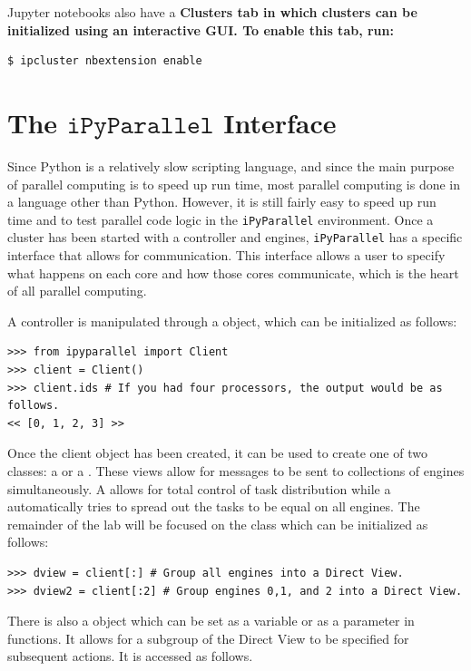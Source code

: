 \begin{info}
Jupyter notebooks also have a \bf{Clusters} tab in which clusters can be initialized using an interactive GUI.
To enable this tab, run:
\begin{lstlisting}[style=ShellInput]
$ ipcluster nbextension enable
\end{lstlisting}
\end{info}


\section*{The $\texttt{iPyParallel}$ Interface}
Since Python is a relatively slow scripting language, and since the main purpose of parallel computing is to speed up run time, most parallel computing is done in a language other than Python.
However, it is still fairly easy to speed up run time and to test parallel code logic in the \texttt{iPyParallel} environment.
Once a cluster has been started with a controller and engines, \texttt{iPyParallel} has a specific interface that allows for communication. 
This interface allows a user to specify what happens on each core and how those cores communicate, which is the heart of all parallel computing.

A controller is manipulated through a  object, which can be initialized as follows:

\begin{lstlisting}
>>> from ipyparallel import Client
>>> client = Client()
>>> client.ids # If you had four processors, the output would be as follows.
<< [0, 1, 2, 3] >>
\end{lstlisting}

Once the client object has been created, it can be used to create one of two classes: a  or a .
These views allow for messages to be sent to collections of engines simultaneously.
A  allows for total control of task distribution while a  automatically tries to spread out the tasks to be equal on all engines.
The remainder of the lab will be focused on the  class which can be initialized as follows:

\begin{lstlisting}
>>> dview = client[:] # Group all engines into a Direct View.
>>> dview2 = client[:2] # Group engines 0,1, and 2 into a Direct View.
\end{lstlisting}

There is also a  object which can be set as a  variable or as a parameter in functions.
It allows for a subgroup of the Direct View to be specified for subsequent actions.
It is accessed as follows.

